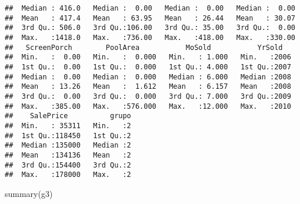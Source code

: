 \documentclass[
]{article}
\newenvironment{Shaded}{\begin{snugshade}}{\end{snugshade}}
\newcommand{\FunctionTok}[1]{\textcolor[rgb]{0.00,0.00,0.00}{#1}}
\newcommand{\NormalTok}[1]{#1}
\begin{document}
\begin{verbatim}
##  Median : 416.0   Median :  0.00   Median :  0.00   Median :  0.00  
##  Mean   : 417.4   Mean   : 63.95   Mean   : 26.44   Mean   : 30.07  
##  3rd Qu.: 506.0   3rd Qu.:106.00   3rd Qu.: 35.00   3rd Qu.:  0.00  
##  Max.   :1418.0   Max.   :736.00   Max.   :418.00   Max.   :330.00  
##   ScreenPorch        PoolArea           MoSold           YrSold    
##  Min.   :  0.00   Min.   :  0.000   Min.   : 1.000   Min.   :2006  
##  1st Qu.:  0.00   1st Qu.:  0.000   1st Qu.: 4.000   1st Qu.:2007  
##  Median :  0.00   Median :  0.000   Median : 6.000   Median :2008  
##  Mean   : 13.26   Mean   :  1.612   Mean   : 6.157   Mean   :2008  
##  3rd Qu.:  0.00   3rd Qu.:  0.000   3rd Qu.: 7.000   3rd Qu.:2009  
##  Max.   :385.00   Max.   :576.000   Max.   :12.000   Max.   :2010  
##    SalePrice          grupo  
##  Min.   : 35311   Min.   :2  
##  1st Qu.:118450   1st Qu.:2  
##  Median :135000   Median :2  
##  Mean   :134136   Mean   :2  
##  3rd Qu.:154400   3rd Qu.:2  
##  Max.   :178000   Max.   :2
\end{verbatim}

\begin{Shaded}
\begin{Highlighting}[]
\FunctionTok{summary}\NormalTok{(g3)}
\end{Highlighting}
\end{Shaded}
\end{document}
